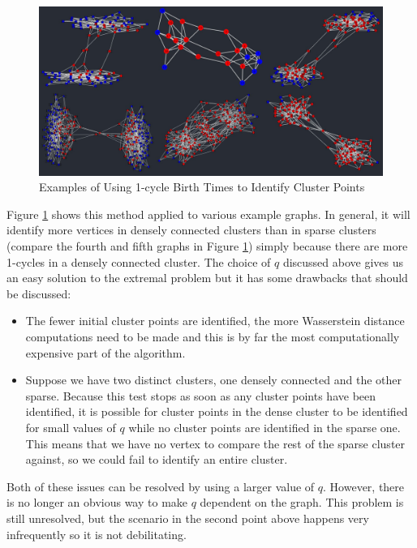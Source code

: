 \documentclass[12pt,a4paper]{amsart}
\numberwithin{equation}{section}
\theoremstyle{plain}
\theoremstyle{definition}
\begin{document}
\begin{figure}[h]
	\centering
	\includegraphics[scale=0.55]{InitialClusterPoints.jpg}
	\caption{Examples of Using 1-cycle Birth Times to Identify Cluster Points}
	\label{birthTimesTest}
\end{figure}

\newpage

Figure \ref{birthTimesTest} shows this method applied to various example graphs. In general, it will identify more vertices in densely connected clusters than in sparse clusters (compare the fourth and fifth graphs in Figure \ref{birthTimesTest}) simply because there are more 1-cycles in a densely connected cluster. The choice of $q$ discussed above gives us an easy solution to the extremal problem but it has some drawbacks that should be discussed: 
\begin{itemize}
	\item The fewer initial cluster points are identified, the more Wasserstein distance computations need to be made and this is by far the most computationally expensive part of the algorithm.
	\item Suppose we have two distinct clusters, one densely connected and the other sparse. Because this test stops as soon as any cluster points have been identified, it is possible for cluster points in the dense cluster to be identified for small values of $q$ while no cluster points are identified in the sparse one. This means that we have no vertex to compare the rest of the sparse cluster against, so we could fail to identify an entire cluster.
\end{itemize}

Both of these issues can be resolved by using a larger value of $q$. However, there is no longer an obvious way to make $q$ dependent on the graph. This problem is still unresolved, but the scenario in the second point above happens very infrequently so it is not debilitating.
\end{document}
